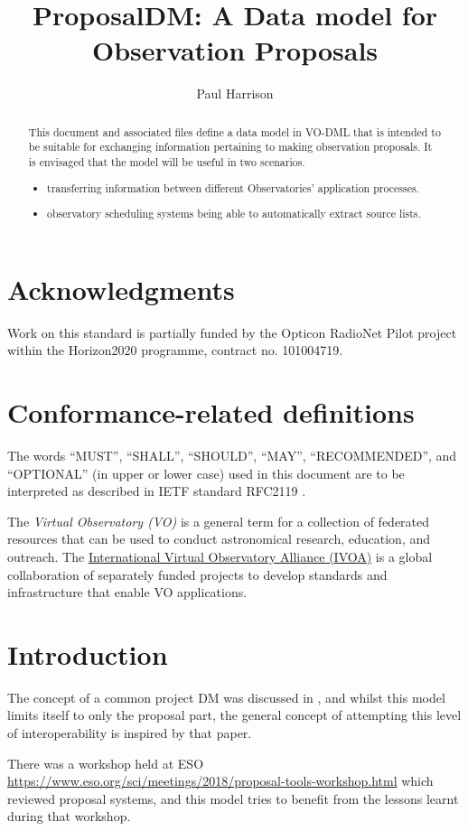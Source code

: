 \documentclass[10pt,a4paper]{ivoa}
\title{ProposalDM: A Data model for Observation Proposals}
\author[????URL????]{Paul Harrison}
\begin{document}
\begin{abstract}
This document and associated files define a data model in VO-DML that is intended to be suitable for exchanging
    information pertaining to making observation proposals. It is envisaged that the model will be useful in two scenarios.
\begin{itemize}
    \item transferring information between different Observatories' application processes.
    \item observatory scheduling systems being able to automatically extract source lists.
\end{itemize}
\end{abstract}


\section*{Acknowledgments}

Work on this standard is partially funded by the Opticon RadioNet Pilot project within the Horizon2020 programme, contract no. 101004719.

\section*{Conformance-related definitions}

The words ``MUST'', ``SHALL'', ``SHOULD'', ``MAY'', ``RECOMMENDED'', and
``OPTIONAL'' (in upper or lower case) used in this document are to be
interpreted as described in IETF standard RFC2119 \citep{std:RFC2119}.

The \emph{Virtual Observatory (VO)} is a
general term for a collection of federated resources that can be used
to conduct astronomical research, education, and outreach.
The \href{https://www.ivoa.net}{International
Virtual Observatory Alliance (IVOA)} is a global
collaboration of separately funded projects to develop standards and
infrastructure that enable VO applications.


\section{Introduction}


The concept of a common project DM was discussed in \cite{2008SPIE.7019E..0PB}, and whilst this model limits itself to
only the proposal part, the general concept of attempting this level of interoperability is inspired by that paper.

There was a workshop held at ESO \url{https://www.eso.org/sci/meetings/2018/proposal-tools-workshop.html} which reviewed
proposal systems, and this model tries to benefit from the lessons learnt during that workshop.
\end{document}
